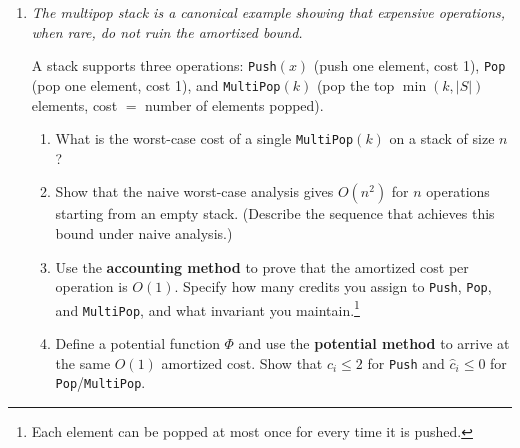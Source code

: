 \documentclass[9pt]{book}
\begin{document}
\begin{enumerate}[label=\arabic*.]
\begin{enumerate}

\end{enumerate}


\item \textit{The multipop stack is a canonical example showing that expensive operations, when rare, do not ruin the amortized bound.}

A stack supports three operations: \texttt{Push}$(x)$ (push one element, cost 1), \texttt{Pop} (pop one element, cost 1), and \texttt{MultiPop}$(k)$ (pop the top $\min(k, |S|)$ elements, cost $= $ number of elements popped).

\begin{enumerate}
    \item What is the worst-case cost of a single \texttt{MultiPop}$(k)$ on a stack of size $n$?
    \item Show that the naive worst-case analysis gives $O(n^2)$ for $n$ operations starting from an empty stack. (Describe the sequence that achieves this bound under naive analysis.)
    \item Use the \textbf{accounting method} to prove that the amortized cost per operation is $O(1)$. Specify how many credits you assign to \texttt{Push}, \texttt{Pop}, and \texttt{MultiPop}, and what invariant you maintain.\footnote{Each element can be popped at most once for every time it is pushed.}
    \item Define a potential function $\Phi$ and use the \textbf{potential method} to arrive at the same $O(1)$ amortized cost. Show that $\hat{c}_i \leq 2$ for \texttt{Push} and $\hat{c}_i \leq 0$ for \texttt{Pop}/\texttt{MultiPop}.
\end{enumerate}


\end{enumerate}
\end{document}
